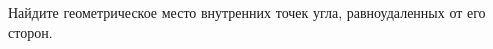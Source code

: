 \begin{ex}
	\begin{condition}
		Найдите геометрическое место внутренних точек угла, равноудаленных от его сторон.
	\end{condition}
\end{ex}